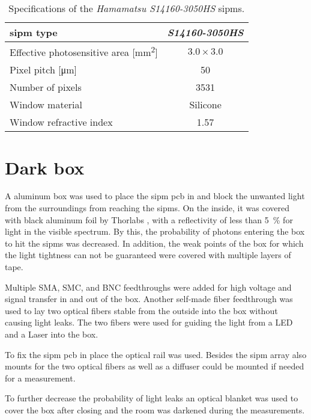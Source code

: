 \begin{table}[]
    \centering
    \caption[Hamamatsu S14160-3050HS SiPM specifications]{Specifications of the \textit{Hamamatsu S14160-3050HS} \ac{sipm}s. \cite{HAMsipm_ds}}
    \setlength\extrarowheight{2.5pt}
    \begin{tabular}{lc}\toprule
	\ac{sipm} type & \textit{S14160-3050HS}  \\[2.5pt]\midrule
        Effective photosensitive area [\si{\square\milli\meter}] & $3.0\times 3.0$  \\[2.5pt]
        Pixel pitch [\si{\micro\meter}] & 50 \\[2.5pt]
        Number of pixels & 3531  \\[2.5pt]
        Window material & Silicone  \\[2.5pt]
        Window refractive index & 1.57  \\[2.5pt]\bottomrule
    \end{tabular}
    \label{tab:sipm_specs}
\end{table}



\section{Dark box}
A aluminum box was used to place the \ac{sipm} \ac{pcb} in and block the unwanted light from the surroundings from reaching the \ac{sipm}s.
On the inside, it was covered with black aluminum foil by Thorlabs \cite{thorlabs_aluminium}, with a reflectivity of less than \SI{5}{\percent} for light in the visible spectrum.
By this, the probability of photons entering the box to hit the \ac{sipm}s was decreased.
In addition, the weak points of the box for which the light tightness can not be guaranteed were covered with multiple layers of tape.

Multiple SMA, SMC, and BNC feedthroughs were added for high voltage and signal transfer in and out of the box.
Another self-made fiber feedthrough was used to lay two optical fibers stable from the outside into the box without causing light leaks. 
The two fibers were used for guiding the light from a LED and a Laser into the box.

To fix the \ac{sipm} \ac{pcb} in place the optical rail was used. 
Besides the \ac{sipm} array also mounts for the two optical fibers as well as a diffuser \cite{thorlabs_diffusor} could be mounted if needed for a measurement.

To further decrease the probability of light leaks an optical blanket was used to cover the box after closing and the room was darkened during the measurements.

